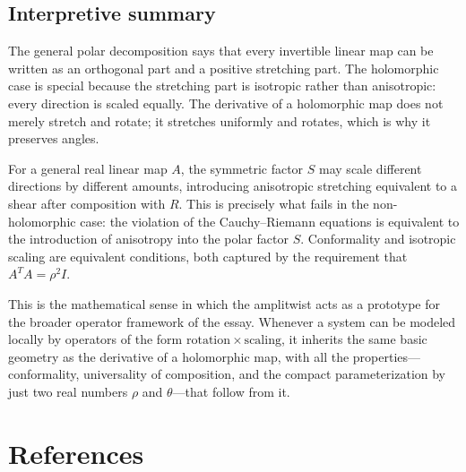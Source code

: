 \documentclass[11pt, a4paper]{article}
\theoremstyle{plain}
\theoremstyle{definition}
\theoremstyle{remark}
\begin{document}
\subsection{Interpretive summary}

The general polar decomposition says that every invertible linear map can be written
as an orthogonal part and a positive stretching part. The holomorphic case is special
because the stretching part is isotropic rather than anisotropic: every direction is
scaled equally. The derivative of a holomorphic map does not merely stretch and rotate;
it stretches uniformly and rotates, which is why it preserves angles.

For a general real linear map $A$, the symmetric factor $S$ may scale different
directions by different amounts, introducing anisotropic stretching equivalent to a
shear after composition with $R$. This is precisely what fails in the non-holomorphic
case: the violation of the Cauchy--Riemann equations is equivalent to the introduction
of anisotropy into the polar factor $S$. Conformality and isotropic scaling are
equivalent conditions, both captured by the requirement that $A^T A = \rho^2 I$.

This is the mathematical sense in which the amplitwist acts as a prototype for the
broader operator framework of the essay. Whenever a system can be modeled locally by
operators of the form $\mathrm{rotation}\times\mathrm{scaling}$, it inherits the same
basic geometry as the derivative of a holomorphic map, with all the properties---
conformality, universality of composition, and the compact parameterization by just two
real numbers $\rho$ and $\theta$---that follow from it.


\section*{References}
\end{document}
